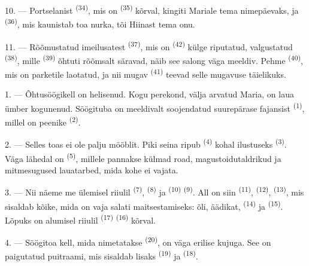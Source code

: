 10. --- Portselanist  \textsuperscript{(34)}, mis on
 \textsuperscript{(35)} kõrval, kingiti Mariale tema nimepäevaks, ja
 \textsuperscript{(36)}, mis kaunistab toa nurka, tõi Hiinast tema onu.

11. --- Rõõmustatud imeilusatest  \textsuperscript{(37)}, mis on
 \textsuperscript{(42)} külge riputatud, valgustatud 
\textsuperscript{(38)}, mille  \textsuperscript{(39)} õhtuti
rõõmsalt säravad, näib see salong väga meeldiv. Pehme 
\textsuperscript{(40)}, mis on parketile laotatud, ja nii mugav 
\textsuperscript{(41)} teevad selle mugavuse täielikuks.

\VUsaut{3.6mm}
\VUsaut{3.0mm}

1. --- Õhtusöögikell on helisenud. Kogu perekond, välja arvatud Maria, on laua ümber
kogunenud. Söögituba on meeldivalt soojendatud suurepärase fajansist 
\textsuperscript{(1)}, millel on peenike  \textsuperscript{(2)}.

2. --- Selles toas ei ole palju mööblit. Piki seina ripub 
\textsuperscript{(4)} kohal ilustuseks  \textsuperscript{(3)}. Väga
lähedal on  \textsuperscript{(5)}, millele pannakse külmad road,
magustoidutaldrikud ja mitmesugused lauatarbed, mida kohe ei vajata.

3. --- Nii näeme me ülemisel riiulil 
\textsuperscript{(7)},  \textsuperscript{(8)} ja 
\textsuperscript{(10)}  \textsuperscript{(9)}. All on siin
 \textsuperscript{(11)},  \textsuperscript{(12)},
 \textsuperscript{(13)}, mis sisaldab kõike, mida on vaja salati
maitsestamiseks: õli, äädikat,  \textsuperscript{(14)} ja 
\textsuperscript{(15)}. Lõpuks on alumisel riiulil  \textsuperscript{(17)}
 \textsuperscript{(16)} kõrval.

4. --- Söögitoa kell, mida nimetatakse  \textsuperscript{(20)}, on
väga erilise kujuga. See on paigutatud puitraami, mis sisaldab lisaks
 \textsuperscript{(19)} ja 
\textsuperscript{(18)}.

